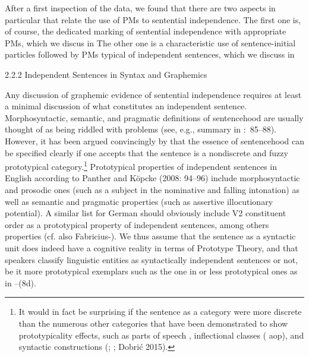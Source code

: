 \begin{styleMoutonText}
After a first inspection of the data, we found that there are two aspects in particular that relate the use of PMs to sentential independence. The first one is, of course, the dedicated marking of sentential independence with appropriate PMs, which we discus in  The other one is a characteristic use of sentence-initial particles followed by PMs typical of independent sentences, which we discuss in 
\end{styleMoutonText}

\begin{styleMoutonHeadingii}
2.2.2  Independent Sentences in Syntax and Graphemics
\end{styleMoutonHeadingii}

\begin{styleMoutonTextBeforeExample}
Any discussion of graphemic evidence of sentential independence requires at least a minimal discussion of what constitutes an independent sentence. Morphosyntactic, semantic, and pragmatic definitions of sentencehood are usually thought of as being riddled with problems (see, e.g., summary in \citealt{PantherKöpcke2008}:~85–88). However, it has been argued convincingly by \citet{PantherKöpcke2008} that the essence of sentencehood can be specified clearly if one accepts that the sentence is a nondiscrete and fuzzy prototypical category.\footnote{It would in fact be surprising if the sentence as a category were more discrete than the numerous other categories that have been demonstrated to show prototypicality effects, such as parts of speech \citep{Uehara2003}, inflectional classes (\citealt{Schäfer2016} aop), and syntactic constructions (\citealt{Gries2003}; \citealt{DivjakArppe2013}; Dobrić 2015).} Prototypical properties of independent sentences in English according to Panther and Köpcke (2008: 94–96) include morphosyntactic and prosodic ones (such as a subject in the nominative and falling intonation) as well as semantic and pragmatic properties (such as assertive illocutionary potential). A similar list for German should obviously include V2 constituent order as a prototypical property of independent sentences, among others properties (cf. also Fabricius-\citealt{Hansen2011}). We thus assume that the sentence as a syntactic unit does indeed have a cognitive reality in terms of Prototype Theory, and that speakers classify linguistic entities as syntactically independent sentences or not, be it more prototypical exemplars such as the one in  or less prototypical ones as in –(8d).
\end{styleMoutonTextBeforeExample}

